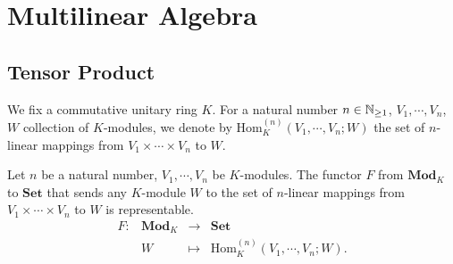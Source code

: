 \chapter{Multilinear Algebra}
\section{Tensor Product}

\quad We fix a commutative unitary ring $K$.
For a natural number $n\in \mathbb{N}_{\ge 1}$, $V_1,\cdots, V_n$, $W$ collection of $K$-modules,
we denote by $\mathrm{Hom}_{K}^{(n)} \left(V_1,\cdots,V_n;W\right)$ the set of $n$-linear mappings from $V_1\times\cdots\times V_n$ to $W$.

\begin{theoremenv}\label{thm:4.1.1}
    Let $n$ be a natural number, $V_1,\cdots, V_n$ be $K$-modules.
    The functor $F$ from $\mathbf{Mod}_{K}$ to $\mathbf{Set}$ that sends any $K$-module $W$ to the set of $n$-linear mappings from $V_1\times\cdots\times V_n$ to $W$ is representable.
    $$\begin{array}{rrcl}
        F: & \mathbf{Mod}_{K} & \longrightarrow & \mathbf{Set}\\
        & W & \longmapsto & \mathrm{Hom}_{K}^{(n)} \left(V_1,\cdots,V_n;W\right).
    \end{array}$$
\end{theoremenv}
